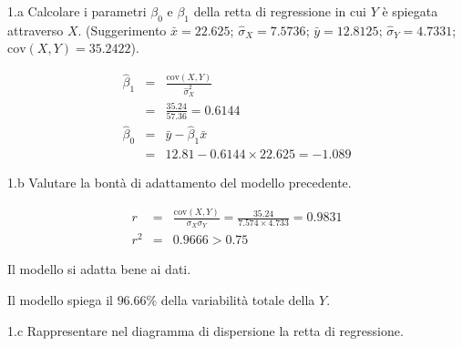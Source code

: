 \documentclass[
  11pt,
]{book}
\theoremstyle{mytheoremstyle}
\theoremstyle{mydefstyle}
\newenvironment{sol}
  {
  \begin{tcolorbox}[enhanced,breakable,arc=0.1mm,boxrule=1pt,colback=white,colframe=iblue,
  title=\bf \fontfamily{lmss}\selectfont \hspace{.5 cm} Soluzione,drop fuzzy shadow]

}{
\end{tcolorbox}
  }
\begin{document}
1.a Calcolare i parametri \(\beta_{0}\) e \(\beta_{1}\)
della retta di regressione in cui \(Y\) è spiegata attraverso \(X\).
(Suggerimento \(\bar{x} = 22.625\); \(\hat\sigma_{X} = 7.5736\);
\(\bar{y} = 12.8125\); \(\hat\sigma_{Y} = 4.7331\); \(\text{cov}(X,Y)= 35.2422\)).

\begin{sol}
\begin{eqnarray*}
       \hat\beta_1 &=& \frac{\text{cov}(X,Y)}{\hat\sigma_X^2} \\
            &=& \frac{ 35.24 }{ 57.36 }  =  0.6144 \\
      \hat\beta_0 &=& \bar y - \hat\beta_1 \bar x\\
          &=&  12.81 - 0.6144 \times  22.625 = -1.089 
      \end{eqnarray*}

\end{sol}

1.b Valutare la bontà di adattamento del modello precedente.

\begin{sol}
\begin{eqnarray*}
r&=&\frac{\text{cov}(X,Y)}{\sigma_X\sigma_Y}=\frac{ 35.24 }{ 7.574 \times 4.733 }= 0.9831 \\ 
r^2&=& 0.9666 > 0.75
\end{eqnarray*}

Il modello si adatta bene ai dati.

Il modello spiega il \(96.66\%\) della variabilità totale della \(Y\).

\end{sol}

1.c Rappresentare nel diagramma di dispersione la retta di regressione.
\end{document}
